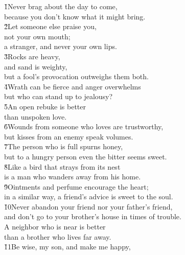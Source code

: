 \begin{poetry}
\poeml {}
\v{1}Never brag about the day to come, \\
\poeml because you don't know what it might bring. \\
\poeml \v{2}Let someone else praise you, \\
\poemll    not your own mouth; \\
\poemlll       a stranger, and never your own lips. \\
\poeml \v{3}Rocks are heavy, \\
\poemll    and sand is weighty, \\
\poemlll       but a fool's provocation outweighs them both. \\
\poeml \v{4}Wrath can be fierce and anger overwhelms \\
\poemll    but who can stand up to jealousy? \\
\poeml \v{5}An open rebuke is better \\
\poemll    than unspoken love. \\
\poeml \v{6}Wounds from someone who loves are trustworthy, \\
\poemll    but kisses from an enemy speak volumes. \\
\poeml \v{7}The person who is full spurns honey, \\
\poemll    but to a hungry person even the bitter seems sweet. \\
\poeml \v{8}Like a bird that strays from its nest \\
\poemll    is a man who wanders away from his home. \\
\poeml \v{9}Ointments and perfume encourage the heart; \\
\poemll    in a similar way, a friend's advice is sweet to the soul. \\
\poeml \v{10}Never abandon your friend nor your father's friend, \\
\poemll    and don't go to your brother's house in times of trouble. \\
\poeml A neighbor who is near is better \\
\poemll    than a brother who lives far away. \\
\poeml \v{11}Be wise, my son, and make me happy, \\

\end{poetry}
